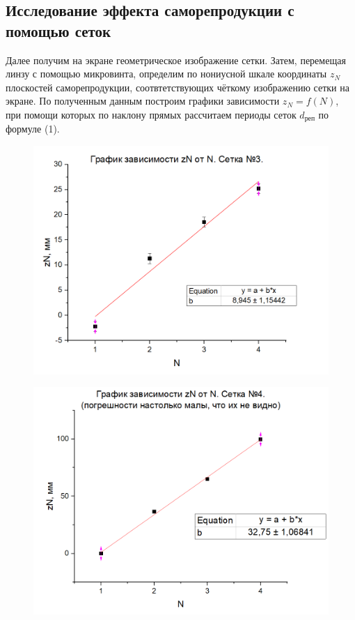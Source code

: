 \documentclass[a4paper,12pt]{article}
\begin{document}
\subsection*{Исследование эффекта саморепродукции с помощью сеток}
Далее получим на экране геометрическое изображение сетки. Затем, перемещая линзу с помощью микровинта, определим по нониусной шкале координаты $z_N$ плоскостей саморепродукции, соотвтетствующих чёткому изображению сетки на экране. По полученным данным построим графики зависимости $z_N = f(N)$, при помощи которых по наклону прямых рассчитаем периоды сеток $d_\text{реп}$ по формуле (1).
\begin{figure}[H]
\centering
\includegraphics[scale=0.65]{graph1.png}

\end{figure}

\begin{figure}[H]
\centering
\includegraphics[scale=0.65]{graph2.png}

\end{figure}
\end{document}
